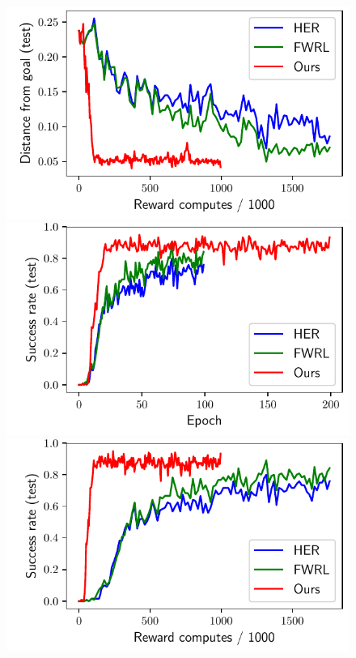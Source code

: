 \begin{figure}
  \includegraphics[width=\frac\columnwidth]{media/res/6efc1de-path_reward_low_thresh_chosen-FetchPickAndPlacePR-v1-dqst/reward_computes-test/ag_g_dist.pdf}%
  \includegraphics[width=\frac\columnwidth]{media/res/6efc1de-path_reward_low_thresh_chosen-FetchPickAndPlacePR-v1-dqst/epoch-test/success_rate.pdf}%
  \includegraphics[width=\frac\columnwidth]{media/res/6efc1de-path_reward_low_thresh_chosen-FetchPickAndPlacePR-v1-dqst/reward_computes-test/success_rate.pdf}\\

\end{figure}
